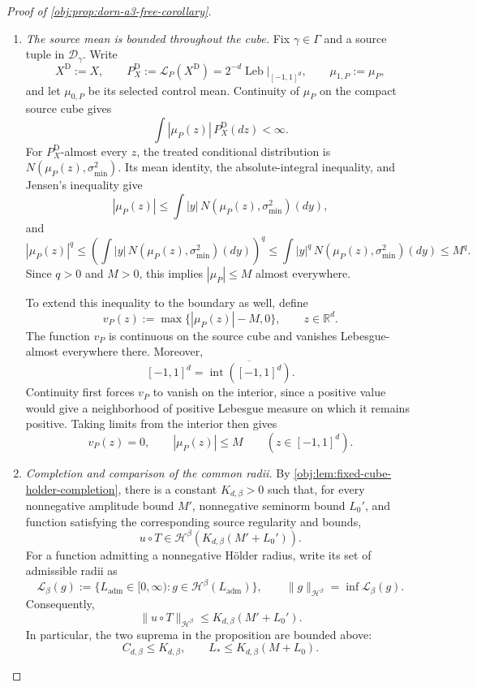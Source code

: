 \documentclass[11pt]{article}
\begin{document}
\begin{proof}[Proof of \cref{obj:prop:dorn-a3-free-corollary}]
\begin{enumerate}
\item \emph{The source mean is bounded throughout the cube.}
Fix \(\gamma\in\Gamma\) and a source tuple in \(\mathcal D_\gamma\). Write
\[
X^{\mathrm D}:=X,
\qquad
P_X^{\mathrm D}:=\mathcal L_P(X^{\mathrm D})
=2^{-d}\operatorname{Leb}\big|_{[-1,1]^d},
\qquad
\mu_{1,P}:=\mu_P,
\]
and let \(\mu_{0,P}\) be its selected control mean. Continuity of \(\mu_P\) on the compact source cube gives
\[
\int |\mu_P(z)|\,P_X^{\mathrm D}(dz)<\infty.
\]
For \(P_X^{\mathrm D}\)-almost every \(z\), the treated conditional distribution is
\(N(\mu_P(z),\sigma_{\min}^2)\). Its mean identity, the absolute-integral inequality, and Jensen's inequality give
\[
|\mu_P(z)|
\le
\int |y|\,N(\mu_P(z),\sigma_{\min}^2)(dy),
\]
and
\[
|\mu_P(z)|^q
\le
\left(\int |y|\,N(\mu_P(z),\sigma_{\min}^2)(dy)\right)^q
\le
\int |y|^q\,N(\mu_P(z),\sigma_{\min}^2)(dy)
\le M^q.
\]
Since \(q>0\) and \(M>0\), this implies \(|\mu_P|\le M\) almost everywhere.

To extend this inequality to the boundary as well, define
\[
v_P(z):=\max\{|\mu_P(z)|-M,0\},
\qquad z\in\mathbb R^d.
\]
The function \(v_P\) is continuous on the source cube and vanishes Lebesgue-almost everywhere there. Moreover,
\[
[-1,1]^d
=
\overline{\operatorname{int}([-1,1]^d)}.
\]
Continuity first forces \(v_P\) to vanish on the interior, since a positive value would give a neighborhood of positive Lebesgue measure on which it remains positive. Taking limits from the interior then gives
\[
v_P(z)=0,
\qquad
|\mu_P(z)|\le M
\qquad(z\in[-1,1]^d).
\]

\item \emph{Completion and comparison of the common radii.}
By \cref{obj:lem:fixed-cube-holder-completion}, there is a constant \(K_{d,\beta}>0\) such that, for every nonnegative amplitude bound \(M'\), nonnegative seminorm bound \(L_0'\), and function satisfying the corresponding source regularity and bounds,
\[
u\circ T
\in
\mathcal H^\beta\!\left(K_{d,\beta}(M'+L_0')\right).
\]
For a function admitting a nonnegative Hölder radius, write its set of admissible radii as
\[
\mathscr L_\beta(g)
:=
\{L_{\mathrm{adm}}\in[0,\infty):
g\in\mathcal H^\beta(L_{\mathrm{adm}})\},
\qquad
\|g\|_{\mathcal H^\beta}
=
\inf\mathscr L_\beta(g).
\]
Consequently,
\[
\|u\circ T\|_{\mathcal H^\beta}
\le K_{d,\beta}(M'+L_0').
\]
In particular, the two suprema in the proposition are bounded above:
\[
C_{d,\beta}\le K_{d,\beta},
\qquad
L_*\le K_{d,\beta}(M+L_0).
\]


\end{enumerate}
\end{proof}
\end{document}
